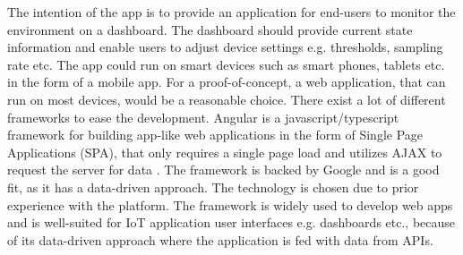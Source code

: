 The intention of the app is to provide an application for end-users to monitor the environment on a dashboard. The dashboard should provide current state information and enable users to adjust device settings e.g. thresholds, sampling rate etc. The app could run on smart devices such as smart phones, tablets etc. in the form of a mobile app. For a proof-of-concept, a web application, that can run on most devices, would be a reasonable choice. There exist a lot of different frameworks to ease the development.  Angular \cite{angular} is a javascript/typescript framework for building app-like web applications in the form of Single Page Applications (SPA), that only requires a single page load and utilizes AJAX to request the server for data \cite{flanagan_2007}. The framework is backed by Google and is a good fit, as it has a data-driven approach. The technology is chosen due to prior experience with the platform. The framework is widely used to develop web apps and is well-suited for IoT application user interfaces e.g. dashboards etc., because of its data-driven approach where the application is fed with data from APIs.